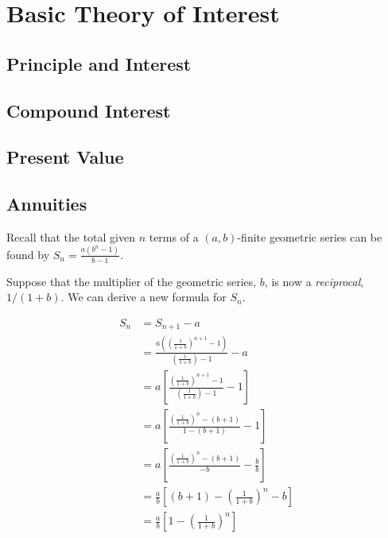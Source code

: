 
\chapter{Basic Theory of Interest}







\section{Principle and Interest}





\section{Compound Interest}


\section{Present Value}


\section{Annuities}


Recall that the total given $n$ terms of a $(a,b)$-finite geometric series can be found by 
$S_n = \frac{a(b^n-1)}{b-1}$.


Suppose that the multiplier of the geometric series, $b$, is now a \textit{reciprocal}, $1/(1+b)$. 
We can derive a new formula for $S_n$. 


\[ \begin{array}{ll}
S_n 
& = S_{n+1} - a \\
& = \frac{a( \left(\frac{1}{1+b}\right)^{n+1}-1)}{(\frac{1}{1+b})-1} - a \\ 
& = a\left[  \frac{\left(\frac{1}{1+b}\right)^{n+1}-1}{(\frac{1}{1+b})-1} - 1\right] \\ 
& = a\left[  \frac{\left(\frac{1}{1+b}\right)^{n}-(b+1)}{1-(b+1)} - 1\right] \\ 
& = a\left[  \frac{\left(\frac{1}{1+b}\right)^{n}-(b+1)}{-b} - \frac{b}{b}\right] \\ 
& = \frac{a}{b}\left[ (b+1) - \left(\frac{1}{1+b}\right)^{n} - b\right] \\
& = \frac{a}{b}\left[ 1 - \left(\frac{1}{1+b}\right)^{n} \right] \\
\end{array}\] 





